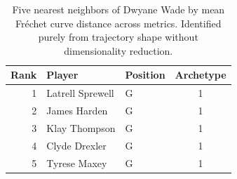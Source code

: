 \begin{table}[htbp]
  \centering\small
  \begin{tabular}{rllc}
    \toprule
    Rank & Player & Position & Archetype \\
    \midrule
    1 & Latrell Sprewell & G & 1 \\
    2 & James Harden & G & 1 \\
    3 & Klay Thompson & G & 1 \\
    4 & Clyde Drexler & G & 1 \\
    5 & Tyrese Maxey & G & 1 \\
    \bottomrule
  \end{tabular}
  \caption{Five nearest neighbors of Dwyane Wade by mean Fr\'{e}chet curve distance across metrics. Identified purely from trajectory shape without dimensionality reduction.}
  \label{tab:Dwyane_Wade_frechet_curve_neighbors}
\end{table}

